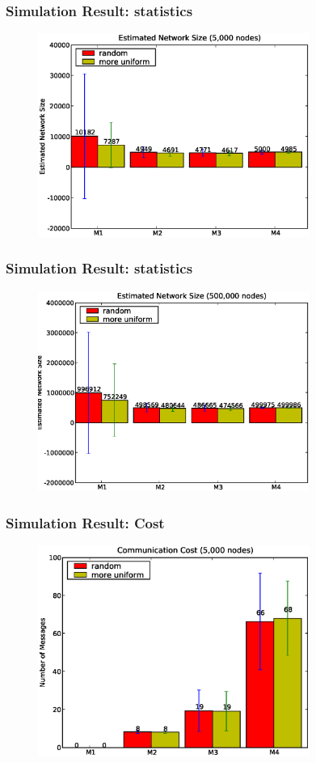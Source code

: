 \documentclass[red]{beamer}
\begin{document}
\begin{frame}
\frametitle{Simulation Result: statistics}
\begin{figure}
\centering
\includegraphics[width=3.5in]{figs/size5k}
\end{figure}
\end{frame}
\begin{frame}
\frametitle{Simulation Result: statistics}
\begin{figure}
\centering
\includegraphics[width=3.5in]{figs/size500k}
\end{figure}
\end{frame}
\begin{frame}
\frametitle{Simulation Result: Cost}
\begin{figure}
\centering
\includegraphics[width=3.5in]{figs/cost5k}
\end{figure}
\end{frame}
\end{document}
